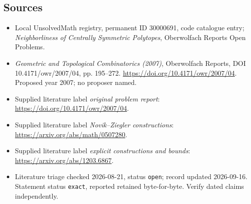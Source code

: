 \documentclass[11pt]{article}
\begin{document}
\subsection{Sources}
\begin{itemize}\item Local UnsolvedMath registry, permanent ID 30000691, code catalogue entry; \emph{Neighborliness of Centrally Symmetric Polytopes}, Oberwolfach Reports Open Problems.\item \emph{Geometric and Topological Combinatorics (2007)}, Oberwolfach Reports, DOI 10.4171/owr/2007/04, pp. 195--272. \url{https://doi.org/10.4171/owr/2007/04}. Proposed year 2007; no proposer named.\item Supplied literature label \emph{original problem report}: \url{https://doi.org/10.4171/owr/2007/04}.\item Supplied literature label \emph{Novik--Ziegler constructions}: \url{https://arxiv.org/abs/math/0507280}.\item Supplied literature label \emph{explicit constructions and bounds}: \url{https://arxiv.org/abs/1203.6867}.\item Literature triage checked 2026-08-21, status \texttt{open}; record updated 2026-09-16. Statement status \texttt{exact}, reported retained byte-for-byte. Verify dated claims independently.\end{itemize}
\end{document}
